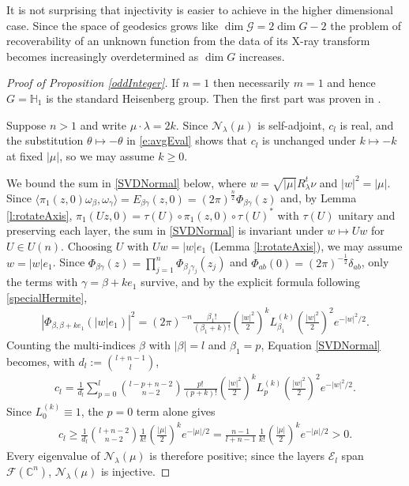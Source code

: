 \documentclass[11pt]{amsart}
\theoremstyle{plain}
\theoremstyle{definition}
\theoremstyle{remark}
\numberwithin{equation}{section}
\def\cE{\mathcal{E}}
\def\cN{\mathcal{N}}
\def\cG{\mathcal{G}}
\def\cF{\mathcal{F}}
\def\C{{\mathbb C}}%
\def \heis {\mathbb{H}}
\numberwithin{equation}{section}
\begin{document}
It is not surprising that injectivity is easier to achieve in the higher dimensional case. Since the space of geodesics grows like $\dim \cG= 2\dim G-2$ the problem of recoverability of an unknown function from the data of its X-ray transform becomes increasingly overdetermined as $\dim G$ increases. 
\begin{proof}[Proof of Proposition \ref{oddInteger}]
	If $n=1$ then necessarily $m=1$ and hence $G=\heis_1$ is the standard Heisenberg group. Then the first part was proven in \cite{flynnInjectivityHeisenbergXray2021}.

	Suppose $n>1$ and write $\mu\cdot\lambda=2k$. Since $\cN_\lambda(\mu)$ is self-adjoint, $c_l$ is real, and the substitution $\theta\mapsto-\theta$ in \eqref{e:avgEval} shows that $c_l$ is unchanged under $k\mapsto-k$ at fixed $|\mu|$, so we may assume $k\geq0$.

	We bound the sum in \eqref{SVDNormal} below, where $w=\sqrt{|\mu|}R_\lambda^t\nu$ and $|w|^2=|\mu|$. Since $\langle\pi_1(z, 0)\omega_\beta, \omega_\gamma\rangle=E_{\beta\gamma}(z, 0)=(2\pi)^{\frac{n}{2}}\Phi_{\beta\gamma}(z)$ and, by Lemma \ref{l:rotateAxis}, $\pi_1(Uz, 0)=\tau(U)\circ\pi_1(z, 0)\circ\tau(U)^*$ with $\tau(U)$ unitary and preserving each layer, the sum in \eqref{SVDNormal} is invariant under $w\mapsto Uw$ for $U\in U(n)$. Choosing $U$ with $Uw=|w|e_1$ (Lemma \ref{l:rotateAxis}), we may assume $w=|w|e_1$. Since $\Phi_{\beta\gamma}(z)=\prod_{j=1}^n\Phi_{\beta_j\gamma_j}(z_j)$ and $\Phi_{ab}(0)=(2\pi)^{-\frac{1}{2}}\delta_{ab}$, only the terms with $\gamma=\beta+ke_1$ survive, and by the explicit formula following \eqref{specialHermite},
	\begin{align*}
		|\Phi_{\beta, \beta+ke_1}(|w|e_1)|^2=(2\pi)^{-n}\frac{\beta_1!}{(\beta_1+k)!}\left(\tfrac{|w|^2}{2}\right)^{k}L_{\beta_1}^{(k)}\!\left(\tfrac{|w|^2}{2}\right)^{2}e^{-|w|^2/2}.
	\end{align*}
	Counting the multi-indices $\beta$ with $|\beta|=l$ and $\beta_1=p$, Equation \eqref{SVDNormal} becomes, with $d_l:=\binom{l+n-1}{l}$,
	\begin{align*}
		c_l=\frac{1}{d_l}\sum_{p=0}^l\binom{l-p+n-2}{n-2}\frac{p!}{(p+k)!}\left(\tfrac{|w|^2}{2}\right)^{k}L_{p}^{(k)}\!\left(\tfrac{|w|^2}{2}\right)^{2}e^{-|w|^2/2}.
	\end{align*}
	Since $L_0^{(k)}\equiv1$, the $p=0$ term alone gives
	\begin{align*}
		c_l\geq\frac{1}{d_l}\binom{l+n-2}{n-2}\frac{1}{k!}\left(\tfrac{|\mu|}{2}\right)^{k}e^{-|\mu|/2}=\frac{n-1}{l+n-1}\,\frac{1}{k!}\left(\tfrac{|\mu|}{2}\right)^{k}e^{-|\mu|/2}>0.
	\end{align*}
	Every eigenvalue of $\cN_\lambda(\mu)$ is therefore positive; since the layers $\cE_l$ span $\cF(\C^n)$, $\cN_\lambda(\mu)$ is injective.
\end{proof}
\end{document}
